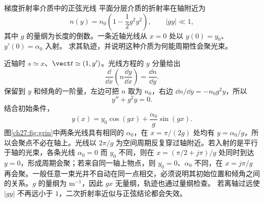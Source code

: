 \begin{origexamplebox}{梯度折射率介质中的正弦光线}
平面分层介质的折射率在轴附近为
\[
 n(y)=n_0\left(1-\frac12g^2y^2\right),
 \qquad |gy|\ll1,
\]
其中 $g$ 的量纲为长度的倒数。一条近轴光线从 $x=0$ 处以 $y(0)=y_0$、$y'(0)=\alpha_0$ 入射。
求其轨迹，并说明这种介质为何能周期性会聚光束。

\begin{center}
\end{center}
\end{origexamplebox}
\begin{xesolution}
近轴时 $s\simeq x$、$\vect t\simeq(1,y')$。光线方程的 $y$ 分量给出
\[
 \frac{\dd}{\dd x}\left(n\frac{\dd y}{\dd x}\right)=\frac{\dd n}{\dd y}.
\]
保留到 $y$ 和倾角的一阶量，左边可把 $n$ 取为 $n_0$，右边
$\dd n/\dd y=-n_0g^2y$，所以
\[
 y''+g^2y=0.
\]
结合初始条件，
\begin{equation}
 \boxed{y(x)=y_0\cos(gx)+\frac{\alpha_0}{g}\sin(gx)}.
\end{equation}
图\ref{ch27:fig:grin}中两条光线具有相同的 $\alpha_0$，在 $x=\pi/(2g)$ 处均有 $y=\alpha_0/g$，所以会聚点不必在轴上。光线以 $2\pi/g$ 为空间周期反复穿过轴附近。若入射的是平行于轴的光束，各条光线 $\alpha_0=0$ 而 $y_0$ 不同，则在
$x=(\pi/2+j\pi)/g$ 处同时到达 $y=0$，形成周期会聚；若来自同一轴上物点，则 $y_0=0$、$\alpha_0$ 不同，在 $x=j\pi/g$ 再会聚。一般任意一束光并不自动在同一点相交，必须说明其初始位置和倾角之间的关系。$g$ 的量纲为 $\mathrm{m^{-1}}$，因此 $gx$ 无量纲，轨迹也通过量纲检查。
若离轴过远使 $|gy|$ 不再远小于 $1$，二次折射率近似与正弦结论都会失效。
\end{xesolution}
